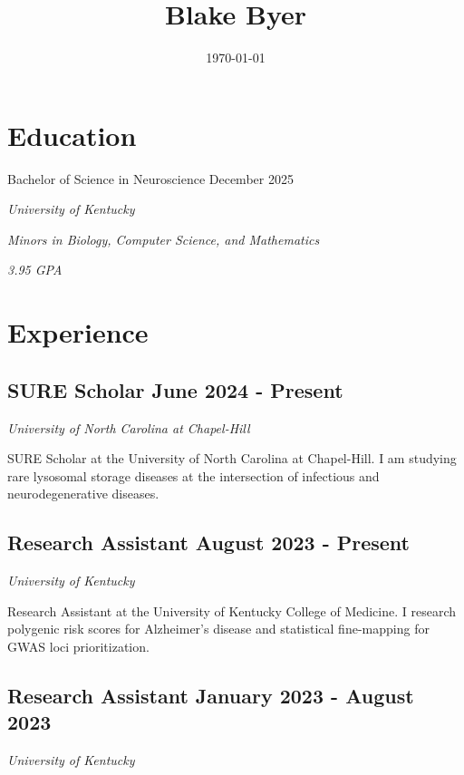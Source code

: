 \documentclass{article}
\begin{document}
\title{\Huge \textbf{Blake Byer} \vspace{-1.25em}}
\author{}
\date{\today}
\maketitle

\begin{flushleft}

\section*{Education}

{\large Bachelor of Science in Neuroscience \vspace{0.5em}}\hfill December 2025

\textit{University of Kentucky}

\textit{Minors in Biology, Computer Science, and Mathematics}

\textit{3.95 GPA}

\section*{Experience}

\subsection*{SURE Scholar {\hfill\normalsize\normalfont June 2024 - Present}}
\textit{University of North Carolina at Chapel-Hill \vspace{0.5em}}

SURE Scholar at the University of North Carolina at Chapel-Hill. I am studying rare lysosomal storage diseases
at the intersection of infectious and neurodegenerative diseases.

\subsection*{Research Assistant {\hfill\normalsize\normalfont August 2023 - Present}}
\textit{University of Kentucky \vspace{0.5em}}

Research Assistant at the University of Kentucky College of Medicine. I research polygenic risk scores for 
Alzheimer's disease and statistical fine-mapping for GWAS loci prioritization.

\subsection*{Research Assistant {\hfill\normalsize\normalfont January 2023 - August 2023}}
\textit{University of Kentucky \vspace{0.5em}}


\end{flushleft}
\end{document}

